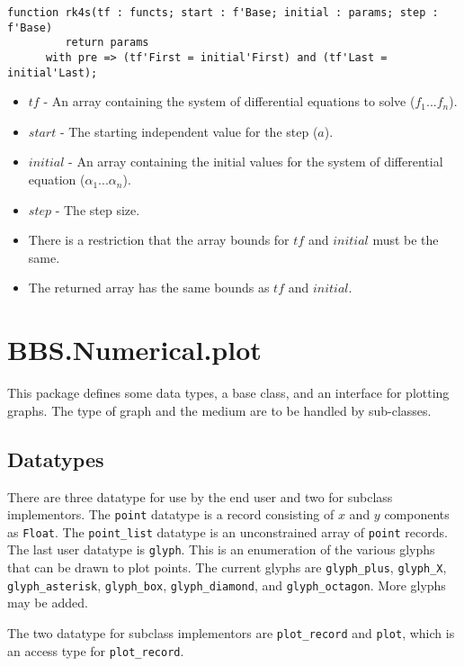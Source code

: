 \documentclass[10pt, openany]{book}
\newcommand{\datatype}[1]{\texttt{#1}}
\begin{document}
\begin{lstlisting}
function rk4s(tf : functs; start : f'Base; initial : params; step : f'Base)
         return params
      with pre => (tf'First = initial'First) and (tf'Last = initial'Last);
\end{lstlisting}
\begin{itemize}
  \item $tf$ - An array containing the system of differential equations to solve ($f_1 ... f_n$).
  \item $start$ - The starting independent value for the step ($a$).
  \item $initial$ - An array containing the initial values for the system of differential equation ($\alpha_1 ... \alpha_n$).
  \item $step$ - The step size.
  \item There is a restriction that the array bounds for $tf$ and $initial$ must be the same.
  \item The returned array has the same bounds as $tf$ and $initial$.
\end{itemize}

\section{BBS.Numerical.plot}
This package defines some data types, a base class, and an interface for plotting graphs.  The type of graph and the medium are to be handled by sub-classes.

\subsection{Datatypes}
There are three datatype for use by the end user and two for subclass implementors.  The \datatype{point} datatype is a record consisting of $x$ and $y$ components as \datatype{Float}.  The \datatype{point\_list} datatype is an unconstrained array of \datatype{point} records.  The last user datatype is \datatype{glyph}.  This is an enumeration of the various glyphs that can be drawn to plot points.  The current glyphs are \datatype{glyph\_plus}, \datatype{glyph\_X}, \datatype{glyph\_asterisk}, \datatype{glyph\_box}, \datatype{glyph\_diamond}, and \datatype{glyph\_octagon}.  More glyphs may be added.

The two datatype for subclass implementors are \datatype{plot\_record} and \datatype{plot}, which is an access type for \datatype{plot\_record}.
\end{document}
